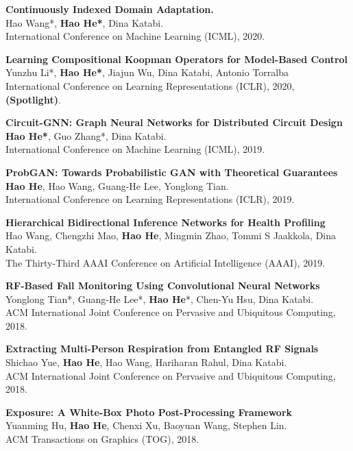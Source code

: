 \documentclass[margin]{res}
\begin{document}
\begin{resume}
\textbf{Continuously Indexed Domain Adaptation.}\\
Hao Wang*, \textbf{Hao He*}, Dina Katabi.\\
International Conference on Machine Learning (ICML), 2020.

\textbf{Learning Compositional Koopman Operators for Model-Based Control}\\
Yunzhu Li*, \textbf{Hao He*}, Jiajun Wu, Dina Katabi, Antonio Torralba\\
International Conference on Learning Representations (ICLR), 2020, \textbf{(Spotlight)}.

\textbf{Circuit-GNN: Graph Neural Networks for Distributed Circuit Design}\\
\textbf{Hao He*}, Guo Zhang*, Dina Katabi.\\
International Conference on Machine Learning (ICML), 2019.

\textbf{ProbGAN: Towards Probabilistic GAN with Theoretical Guarantees}\\
\textbf{Hao He}, Hao Wang, Guang-He Lee, Yonglong Tian.\\
International Conference on Learning Representations (ICLR), 2019.

\textbf{Hierarchical Bidirectional Inference Networks for Health Profiling}\\
Hao Wang, Chengzhi Mao, \textbf{Hao He}, Mingmin Zhao, Tommi S Jaakkola, Dina Katabi.\\
The Thirty-Third AAAI Conference on Artificial Intelligence (AAAI), 2019.

\textbf{RF-Based Fall Monitoring Using Convolutional Neural Networks}\\
Yonglong Tian*, Guang-He Lee*, \textbf{Hao He}*, Chen-Yu Hsu, Dina Katabi.\\
ACM International Joint Conference on Pervasive and Ubiquitous Computing, 2018.

\textbf{Extracting Multi-Person Respiration from Entangled RF Signals}\\
Shichao Yue, \textbf{Hao He}, Hao Wang, Hariharan Rahul, Dina Katabi.\\
ACM International Joint Conference on Pervasive and Ubiquitous Computing, 2018.

\textbf{Exposure: A White-Box Photo Post-Processing Framework}\\
Yuanming Hu, \textbf{Hao He}, Chenxi Xu, Baoyuan Wang, Stephen Lin.\\
ACM Transactions on Graphics (TOG), 2018.


\end{resume}
\end{document}
